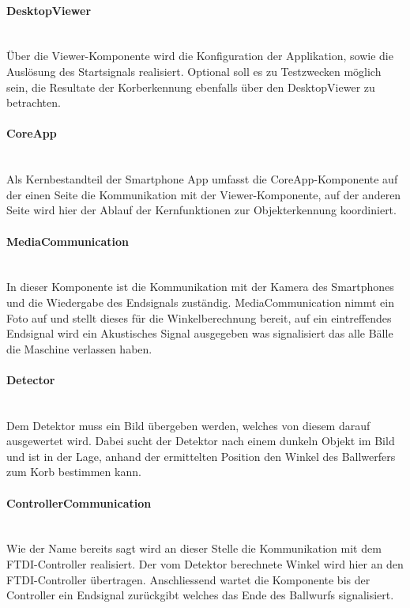 		\paragraph{DesktopViewer}$~~$\vspace{2mm}\\
		Über die Viewer-Komponente wird die Konfiguration der Applikation, sowie die Auslösung des Startsignals realisiert. Optional soll es zu Testzwecken möglich sein, die Resultate der Korberkennung ebenfalls über den DesktopViewer zu betrachten.
		
		\paragraph{CoreApp}$~~$\vspace{2mm}\\
		Als Kernbestandteil der Smartphone App umfasst die CoreApp-Komponente auf der einen Seite die Kommunikation mit der Viewer-Komponente, auf der anderen Seite wird hier der Ablauf der Kernfunktionen zur Objekterkennung koordiniert.		
		
		\paragraph{MediaCommunication}$~~$\vspace{2mm}\\
		In dieser Komponente ist die Kommunikation mit der Kamera des Smartphones und die Wiedergabe des Endsignals zuständig. MediaCommunication nimmt ein Foto auf und stellt dieses für die Winkelberechnung bereit, auf ein eintreffendes Endsignal wird ein Akustisches Signal ausgegeben was signalisiert das alle Bälle die Maschine verlassen haben.
		
		\paragraph{Detector}$~~$\vspace{2mm}\\
		Dem Detektor muss ein Bild übergeben werden, welches von diesem darauf ausgewertet wird. Dabei sucht der Detektor nach einem dunkeln Objekt im Bild und ist in der Lage, anhand der ermittelten Position den Winkel des Ballwerfers zum Korb bestimmen kann.
		

		\paragraph{ControllerCommunication}$~~$\vspace{2mm}\\
		Wie der Name bereits sagt wird an dieser Stelle die Kommunikation mit dem FTDI-Controller realisiert. Der vom Detektor berechnete Winkel wird hier an den FTDI-Controller übertragen. Anschliessend wartet die Komponente bis der Controller ein Endsignal zurückgibt welches das Ende des Ballwurfs signalisiert.
		
